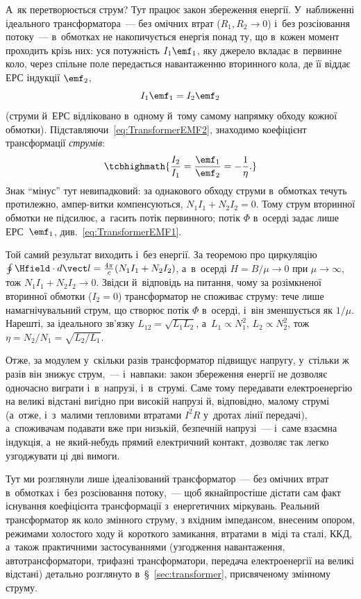 А~як перетворюється струм? Тут працює закон збереження енергії. У~наближенні ідеального трансформатора~--- без омічних втрат ($R_1,R_2\to0$) і~без розсіювання потоку~--- в~обмотках не накопичується енергія понад ту, що в~кожен момент проходить крізь них: уся потужність $I_1\emf_1$, яку джерело вкладає в~первинне коло, через спільне поле передається навантаженню вторинного кола, де її віддає ЕРС індукції $\emf_2$,
\begin{equation*}
	I_1\emf_1 = I_2\emf_2
\end{equation*}
(струми й~ЕРС відліковано в~одному й~тому самому напрямку обходу кожної обмотки). Підставляючи~\eqref{eq:TransformerEMF2}, знаходимо коефіцієнт трансформації \emph{струмів}:
\begin{equation}\label{eq:TransformerCurrentRatio}
	\tcbhighmath{
		\frac{I_2}{I_1} = \frac{\emf_1}{\emf_2} = -\frac1\eta.
	}
\end{equation}
Знак \enquote{мінус} тут невипадковий: за однакового обходу струми в~обмотках течуть протилежно, ампер-витки компенсуються, $N_1I_1+N_2I_2=0$. Тому струм вторинної обмотки не підсилює, а~гасить потік первинного; потік $\Phi$ в~осерді задає лише ЕРС~$\emf_1$, див.~\eqref{eq:TransformerEMF1}.

Той самий результат виходить і~без енергії. За теоремою про циркуляцію $\oint\Hfield\cdot d\vect l=\frac{4\pi}{c}(N_1I_1+N_2I_2)$, а~в~осерді $H=B/\mu\to0$ при $\mu\to\infty$, тож $N_1I_1+N_2I_2\to0$. Звідси й~відповідь на питання, чому за розімкненої вторинної обмотки ($I_2=0$) трансформатор не споживає струму: тече лише намагнічувальний струм, що створює потік $\Phi$ в~осерді, і~він зменшується як $1/\mu$. Нарешті, за ідеального зв'язку $L_{12}=\sqrt{L_1L_2}$, а~$L_1\propto N_1^2$, $L_2\propto N_2^2$, тож $\eta=N_2/N_1=\sqrt{L_2/L_1}$.

Отже, за модулем у~скільки разів трансформатор підвищує напругу, у~стільки ж разів він знижує
струм,~--- і~навпаки: закон збереження енергії не дозволяє одночасно виграти і~в~напрузі,
і~в~струмі. Саме тому передавати електроенергію на великі відстані вигідно при високій
напрузі й, відповідно, малому струмі (а~отже, і~з~малими тепловими втратами $I^2R$
у~дротах лінії передачі), а~споживачам подавати вже при низькій, безпечній напрузі~---
і~саме взаємна індукція, а~не який-небудь прямий електричний контакт, дозволяє так легко
узгоджувати ці дві вимоги.

Тут ми розглянули лише ідеалізований трансформатор~--- без омічних втрат в~обмотках і~без
розсіювання потоку,~--- щоб якнайпростіше дістати сам факт існування коефіцієнта
трансформації з~енергетичних міркувань. Реальний трансформатор як коло змінного струму, з
вхідним імпедансом, внесеним опором, режимами холостого ходу й~короткого замикання,
втратами в~міді та сталі, ККД, а~також практичними застосуваннями (узгодження
навантаження, автотрансформатори, трифазні трансформатори, передача електроенергії на
великі відстані) детально розглянуто в~\S~\ref{sec:transformer}, присвяченому змінному
струму.



